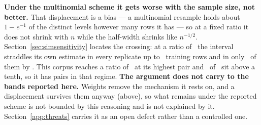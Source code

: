 \textbf{Under the multinomial scheme it gets worse with the sample size, not
better.} That displacement is a bias --- a multinomial resample holds about
$1 - e^{-1}$ of the distinct levels however many rows it has --- so at a fixed
ratio it does not shrink with $n$ while the half-width shrinks like
$n^{-1/2}$. Section~\ref{sec:simsensitivity} locates the crossing: at a ratio
of \straddleRatio\ the interval straddles its own estimate in every replicate
up to \nStraddleAllMax\ training rows and in only \shareStraddleAtHalfPct\ of
them by \nStraddleHalfMin. This corpus reaches a ratio of
\corpusRatioMax\ at its highest pair and \nPairsRatioAboveTenth\ of
\nPairs\ sit above a tenth, so it has pairs in that regime.
\textbf{The argument does not carry to the bands reported here.} Weights
remove the mechanism it rests on, and a displacement survives them anyway
(above), so what remains under the reported scheme is not bounded by this
reasoning and is not explained by it. Section~\ref{app:threats} carries it as
an open defect rather than a controlled one.

